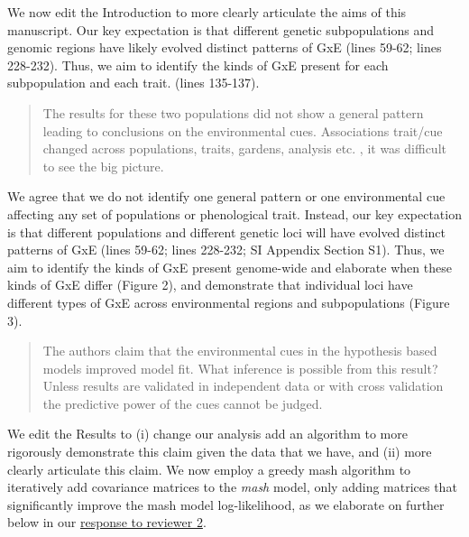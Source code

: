\documentclass[
  letterpaper,
  DIV=11,
  numbers=noendperiod]{scrartcl}
\begin{document}
We now edit the Introduction to more clearly articulate the aims of this
manuscript. Our key expectation is that different genetic subpopulations
and genomic regions have likely evolved distinct patterns of GxE (lines
59-62; lines 228-232). Thus, we aim to identify the kinds of GxE present
for each subpopulation and each trait. (lines 135-137).

\begin{quote}
\begin{tcolorbox}[enhanced jigsaw, rightrule=.15mm, colframe=quarto-callout-warning-color-frame, leftrule=.75mm, arc=.35mm, colback=white, opacityback=0, left=2mm, breakable, toprule=.15mm, bottomrule=.15mm]

The results for these two populations did not show a general pattern
leading to conclusions on the environmental cues. Associations trait/cue
changed across populations, traits, gardens, analysis etc. , it was
difficult to see the big picture.

\end{tcolorbox}
\end{quote}

We agree that we do not identify one general pattern or one
environmental cue affecting any set of populations or phenological
trait. Instead, our key expectation is that different populations and
different genetic loci will have evolved distinct patterns of GxE (lines
59-62; lines 228-232; SI Appendix Section S1). Thus, we aim to identify
the kinds of GxE present genome-wide and elaborate when these kinds of
GxE differ (Figure 2), and demonstrate that individual loci have
different types of GxE across environmental regions and subpopulations
(Figure 3).

\begin{quote}
\begin{tcolorbox}[enhanced jigsaw, rightrule=.15mm, colframe=quarto-callout-warning-color-frame, leftrule=.75mm, arc=.35mm, colback=white, opacityback=0, left=2mm, breakable, toprule=.15mm, bottomrule=.15mm]

The authors claim that the environmental cues in the hypothesis based
models improved model fit. What inference is possible from this result?
Unless results are validated in independent data or with cross
validation the predictive power of the cues cannot be judged.

\end{tcolorbox}
\end{quote}

We edit the Results to (i) change our analysis add an algorithm to more
rigorously demonstrate this claim given the data that we have, and (ii)
more clearly articulate this claim. We now employ a greedy mash
algorithm to iteratively add covariance matrices to the \emph{mash}
model, only adding matrices that significantly improve the mash model
log-likelihood, as we elaborate on further below in our
\hyperref[fig-greedy]{response to reviewer 2}.
\end{document}
